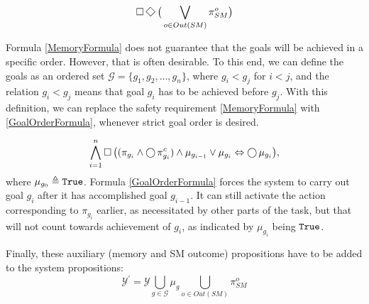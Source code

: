 \begin{equation}\label{SuccessLivenessFormula}
	\LTLG \LTLF \big( \bigvee \limits_{o \in Out(SM)} \pi_{SM}^{o} \big)
\end{equation}

Formula \eqref{MemoryFormula} does not guarantee that the goals will be achieved in a specific order.
However, that is often desirable.
To this end, we can define the goals as an ordered set $\mathcal{G} = \{ g_1, g_2, \ldots, g_n \}$, where $g_i < g_j$ for $i<j$, and the relation $g_i < g_j$ means that goal $g_i$ has to be achieved before $g_j$.
With this definition, we can replace the safety requirement \eqref{MemoryFormula} with \eqref{GoalOrderFormula}, whenever strict goal order is desired.

\begin{equation}\label{GoalOrderFormula}
	\bigwedge \limits_{i = 1}^n \operatorname{\Box} \big( (\pi_{g_i} \wedge \operatorname{\bigcirc} \pi_{g_i}^c) \wedge \mu_{g_{i-1}} \vee \mu_{g_i} \Leftrightarrow \operatorname{\bigcirc} \mu_{g_i} \big),
\end{equation}
where $\mu_{g_0} \triangleq \mathtt{True}$.
Formula \eqref{GoalOrderFormula} forces the system to carry out goal $g_i$ after it has accomplished goal $g_{i-1}$.
It can still activate the action corresponding to $\pi_{g_i}$ earlier, as necessitated by other parts of the task, but that will not count towards achievement of $g_i$, as indicated by $\mu_{g_i}$ being $\mathtt{True}$.

Finally, these auxiliary (memory and SM outcome) propositions have to be added to the system propositions: $$\mathcal{Y}^\prime = \mathcal{Y} \bigcup \limits_{g \in \mathcal{G}} \mu_g \bigcup \limits_{o \in Out(SM)} \pi_{SM}^o$$

